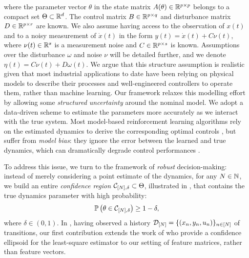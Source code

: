 \documentclass{article}
\begin{document}
where the parameter vector $\theta$ in the state matrix $A(\theta)\in\mathbb{R}^{p\times p}$ belongs to a compact set $\Theta \subset \mathbb{R}^d$. The control matrix $B\in\mathbb{R}^{p\times q}$ and disturbance matrix $D\in\mathbb{R}^{p\times r}$ are known. We also assume having access to the observation of $x(t)$ and to a noisy measurement of $\dot{x}(t)$ in the form $y(t)=\dot{x}(t) + C\nu(t)$, where $\nu(t)\in\mathbb{R}^s$ is a measurement noise and $C\in\mathbb{R}^{p\times s}$ is known. Assumptions over the disturbance $\omega$ and noise $\nu$ will be detailed further, and we denote $\eta(t) = C\nu(t) + D\omega(t)$. We argue that this structure assumption is realistic given that most industrial applications to date have been relying on physical models to describe their processes and well-engineered controllers to operate them, rather than machine learning. Our framework relaxes this modelling effort by allowing some \emph{structured uncertainty} around the nominal model. We adopt a data-driven scheme to estimate the parameters more accurately as we interact with the true system. Most model-based reinforcement learning algorithms rely on the estimated dynamics to derive the corresponding optimal controls \citep[e.g.][]{Lenz2015,Levine2015}, but suffer from \emph{model bias}: they ignore the error between the learned and true dynamics, which can dramatically degrade control performances \citep{Schneider1997}. %

To address this issue, we turn to the framework of \emph{robust} decision-making: instead of merely considering a point estimate of the dynamics, for any $N\in\mathbb{N}$, we build an entire \emph{confidence region} $\mathcal{C}_{[N],\delta}\subset\Theta$, illustrated in , that contains the true dynamics parameter with high probability:
\begin{align}
\mathbb{P}\left(\theta\in \mathcal{C}_{[N],\delta}\right) \geq 1-\delta,
\label{eq:confidence}
\end{align}
where $\delta\in(0,1)$. In , having observed a history $\mathcal{D}_{[N]} = \{(x_n, y_n,u_n)\}_{n\in[N]}$ of transitions, our first contribution extends the work of \citet{Abbasi2011} who provide a confidence ellipsoid for the least-square estimator to our setting of feature matrices, rather than feature vectors. 
\end{document}
